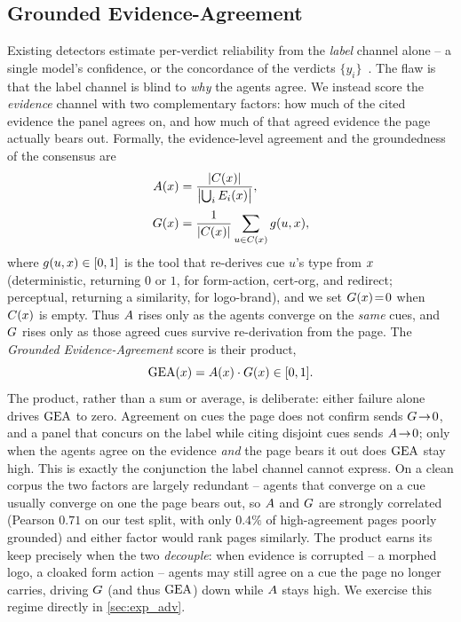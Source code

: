 \subsection{Grounded Evidence-Agreement}
\label{sec:form-gea}
Existing detectors estimate per-verdict reliability from the \emph{label} channel
alone -- a single model's confidence, or the concordance of the verdicts
$\{y_i\}$~\cite{guo2017calibration,ensembleornot2024,dawid1979maximum}. The flaw is
that the label channel is blind to \emph{why} the agents agree. We instead score the
\emph{evidence} channel with two complementary factors: how much of the cited evidence
the panel agrees on, and how much of that agreed evidence the page actually bears out.
Formally, the evidence-level agreement and the groundedness of the consensus are
\begin{align}
A(x) &= \frac{\lvert C(x)\rvert}
                    {\bigl\lvert \bigcup_i E_i(x)\bigr\rvert},
\label{eq:agree}\\[2pt]
G(x) &= \frac{1}{\lvert C(x)\rvert}
               \sum_{u\in C(x)} g(u,x),
\label{eq:ground}
\end{align}
where $g(u,x)\in[0,1]$ is the tool that re-derives cue $u$'s type from $x$
(deterministic, returning $0$ or $1$, for \textsf{form-action}, \textsf{cert-org}, and
\textsf{redirect}; perceptual, returning a similarity, for \textsf{logo-brand}), and we
set $G(x)\!=\!0$ when $C(x)$ is empty. Thus $A$ rises only as the
agents converge on the \emph{same} cues, and $G$ rises only as those agreed cues
survive re-derivation from the page. The \emph{Grounded Evidence-Agreement} score is
their product,
\begin{equation}
\mathrm{GEA}(x) = A(x)\cdot G(x)\in[0,1].
\label{eq:gea}
\end{equation}
The product, rather than a sum or average, is deliberate: either failure alone drives
$\mathrm{GEA}$ to zero. Agreement on cues the page does not confirm sends
$G\!\to\!0$, and a panel that concurs on the label while citing disjoint cues sends
$A\!\to\!0$; only when the agents agree on the evidence \emph{and} the page bears it
out does $\mathrm{GEA}$ stay high. This is exactly the conjunction the label channel
cannot express. On a clean corpus the two factors are largely redundant -- agents that
converge on a cue usually converge on one the page bears out, so $A$ and $G$ are
strongly correlated (Pearson $0.71$ on our test split, with only $0.4\%$ of
high-agreement pages poorly grounded) and either factor would rank pages similarly. The
product earns its keep precisely when the two \emph{decouple}: when evidence is corrupted
-- a morphed logo, a cloaked form action -- agents may still agree on a cue the page no
longer carries, driving $G$ (and thus $\mathrm{GEA}$) down while $A$ stays high. We
exercise this regime directly in \autoref{sec:exp_adv}.

